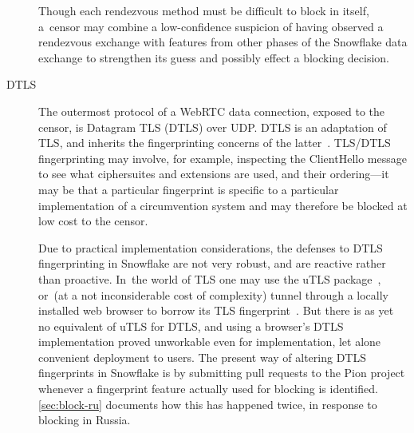 \documentclass[letterpaper,twocolumn]{article}
\begin{document}
\begin{description}
Though each rendezvous method must be difficult to block in itself,
a~censor may combine a low-confidence suspicion of having observed a rendezvous exchange
with features from other phases of the Snowflake data exchange
to strengthen its guess and possibly effect a blocking decision.

\item[DTLS]
The outermost protocol
of a WebRTC data connection, exposed to the censor,
is Datagram TLS (DTLS) over UDP.
DTLS is an adaptation of TLS,
and inherits the fingerprinting concerns of the latter~\cite{Frolov2019a}.
TLS/DTLS fingerprinting may involve, for example,
inspecting the ClientHello message to see what
ciphersuites and extensions are used,
and their ordering---it may be that a particular fingerprint
is specific to a particular implementation of a circumvention system
and may therefore be blocked at low cost to the censor.

Due to practical implementation considerations,
the defenses to DTLS fingerprinting in Snowflake are not very robust,
and are reactive rather than proactive.
In~the world of TLS one may use the uTLS package~\cite[\S VII]{Frolov2019a},
or~(at a not inconsiderable cost of complexity)
tunnel through a locally installed web browser
to borrow its TLS fingerprint~\cite[\S 5.1]{Fifield2015a}.
But there is as yet no equivalent of uTLS for DTLS,
and using a browser's DTLS implementation proved unworkable
even for implementation, let alone convenient deployment to users.
The present way of altering DTLS fingerprints in Snowflake
is by submitting pull requests to the Pion project
whenever a fingerprint feature actually used for blocking is identified.
\autoref{sec:block-ru} documents how this has happened twice,
in response to blocking in Russia.

%


\end{description}
\end{document}
